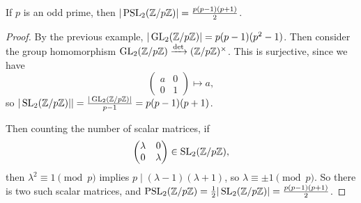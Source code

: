 \documentclass[a4paper]{scrreprt}
\begin{document}
\begin{lemma}
	If $p$ is an odd prime, then $|\operatorname{PSL}_2(\mathbb{Z}/p\mathbb{Z})| = \frac{p(p - 1)(p + 1)}{2}$.
\end{lemma}
\begin{proof}
	By the previous example, $|\operatorname{GL}_2(\mathbb{Z}/p\mathbb{Z})| = p(p-1)(p^2 - 1)$. Then consider the group homomorphism $\operatorname{GL}_2(\mathbb{Z}/p\mathbb{Z}) \xrightarrow{\det} (\mathbb{Z}/p\mathbb{Z})^\times$. This is surjective, since we have
	$$
\begin{pmatrix}
	a & 0 \\
	0 & 1
\end{pmatrix} \longmapsto a,
	$$
	so $|\operatorname{SL}_2(\mathbb{Z}/p\mathbb{Z})|| = \frac{|\operatorname{GL}_2(\mathbb{Z}/p\mathbb{Z})|}{p - 1} = p(p - 1)(p + 1)$. 

	Then counting the number of scalar matrices, if
	$$
	\begin{pmatrix}
		\lambda & 0 \\ 0 & \lambda
	\end{pmatrix} \in \operatorname{SL}_2(\mathbb{Z}/p\mathbb{Z}),
	$$
	then $\lambda^2 \equiv 1\pmod{p}$ implies $p \mid (\lambda - 1)(\lambda + 1)$, so $\lambda \equiv \pm 1 \pmod{p}$. So there is two such scalar matrices, and $\operatorname{PSL}_2(\mathbb{Z}/p\mathbb{Z}) = \frac{1}{2}|\operatorname{SL}_2(\mathbb{Z}/p\mathbb{Z})| = \frac{p(p - 1)(p + 1)}{2}$.
\end{proof}
\end{document}
